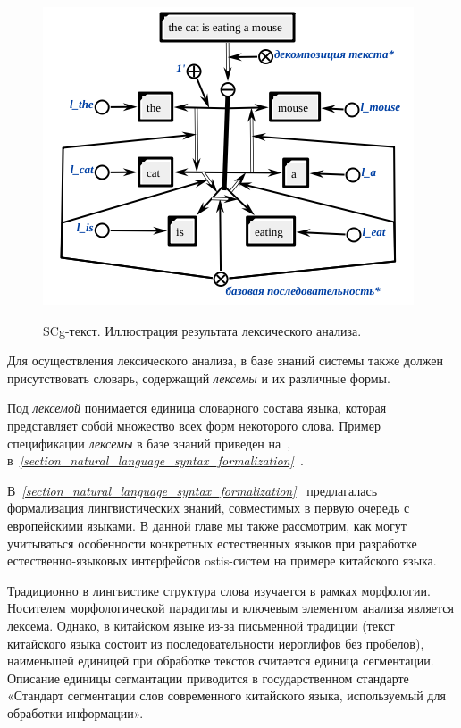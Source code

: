 \begin{figure}[H]
    \caption{SCg-текст. Иллюстрация результата лексического анализа.}
    \includegraphics[scale=0.8]{images/part4/chapter_nl_interfaces/lexical}
    \label{fig:lexical_result}
\end{figure}

Для осуществления лексического анализа, в базе знаний системы также должен присутствовать словарь, содержащий \textit{лексемы} и их различные формы.

Под \textit{лексемой} понимается единица словарного состава языка, которая представляет собой множество всех форм некоторого слова.
Пример спецификации \textit{лексемы} в базе знаний приведен на~\textit{}, в~\textit{\ref{section_natural_language_syntax_formalization}~}.

В~\textit{\ref{section_natural_language_syntax_formalization}~} предлагалась формализация лингвистических знаний, совместимых в первую очередь с европейскими языками.
В данной главе мы также рассмотрим, как могут учитываться особенности конкретных естественных языков при разработке естественно-языковых интерфейсов ostis-систем на примере китайского языка.

Традиционно в лингвистике структура слова изучается в рамках морфологии.
Носителем морфологической парадигмы и ключевым элементом анализа является лексема.
Однако, в китайском языке из-за письменной традиции (текст китайского языка состоит из последовательности иероглифов без пробелов), наименьшей единицей при обработке текстов считается единица сегментации.
Описание единицы сегмантации приводится в государственном стандарте «Стандарт сегментации слов современного китайского языка, используемый для обработки информации».
\begin{SCn}
\end{SCn}

